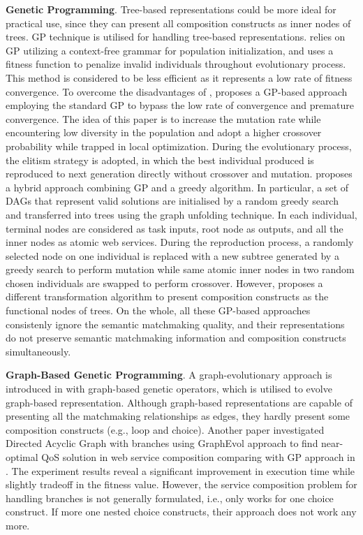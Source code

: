 \textbf{Genetic Programming}.
Tree-based representations could be more ideal for practical use, since they can present all composition constructs as inner nodes of trees. GP technique is utilised for handling tree-based representations. \cite {rodriguez2010composition} relies on GP utilizing a context-free grammar for population initialization, and uses a fitness function to penalize invalid individuals throughout evolutionary process. This method is considered to be less efficient as it represents a low rate of fitness convergence. To overcome the disadvantages of \cite {rodriguez2010composition}, \cite{yu2013adaptive} proposes a GP-based approach employing the standard GP to bypass the low rate of convergence and premature convergence. The idea of this paper is to increase the mutation rate while encountering low diversity in the population and adopt a higher crossover probability while trapped in local optimization.  During the evolutionary process, the elitism strategy is adopted, in which the best individual produced is reproduced to next generation directly without crossover and mutation. \cite{ma2015hybrid} proposes a hybrid approach combining GP and a greedy algorithm. In particular, a set of DAGs that represent valid solutions are initialised by a random greedy search and transferred into trees using the graph unfolding technique.  In each individual,  terminal nodes are considered as task inputs,  root node as  outputs, and all the inner nodes as atomic web services. During the reproduction process,  a randomly selected node on one individual is replaced with a new subtree generated by a greedy search to perform mutation while same atomic inner nodes in two random chosen individuals are swapped to perform crossover. However, \cite{da2016genetic} proposes a different transformation algorithm to present composition constructs as the functional nodes of trees. On the whole, all these GP-based approaches \cite{ma2015hybrid,rodriguez2010composition,da2016genetic,yu2013adaptive} consistenly ignore the semantic matchmaking quality, and their representations do not preserve semantic matchmaking information and composition constructs simultaneously. 

\textbf{Graph-Based Genetic Programming}.
A graph-evolutionary approach is introduced in \cite{da2015graphevol} with graph-based genetic operators, which is utilised to evolve graph-based representation. Although graph-based representations are capable of presenting all the matchmaking relationships as edges, they hardly present some composition constructs (e.g., loop and choice). Another paper \cite{da2016handling} investigated Directed Acyclic Graph with branches using GraphEvol approach \cite{da2015graphevol} to find near-optimal QoS solution in web service composition comparing with GP approach in \cite{da2015gp}. The experiment results reveal a significant improvement in execution time while slightly tradeoff in the fitness value. However, the service composition problem for handling branches is not generally formulated, i.e., only works for one choice construct. If more one nested choice constructs, their approach does not work any more.

